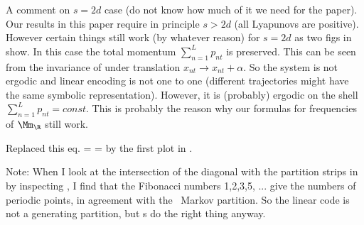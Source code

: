 \begin{description}
  {
A comment on $s=2d$ case (do not know how much of it we need for the paper).
Our results in this paper require in principle  $s>2d$ (all Lyapunovs are
positive). However certain things still work (by whatever reason)  for $s=2d$
as two figs in  show. In this case the total
momentum $\sum_{n=1}^L p_{nt}$ is preserved. This can be seen from the
invariance of  under   translation  $x_{nt}\to
x_{nt}+\alpha$. So the system is not ergodic  and linear encoding is not one
to one (different trajectories might have the same symbolic representation).
However, it is (probably)  ergodic on the shell   $\sum_{n=1}^L p_{nt}=const.$
This is probably the reason why  our formulas for frequencies of  $\Mm_{\R}$
still work.
 }


  {Replaced this eq.
\beq
\Mm\cup\partial\R
    =
    =
by the first plot in .
 }

     {
Note: When I look
at the intersection of the diagonal with the partition strips in by
inspecting , I find that the Fibonacci
numbers 1,2,3,5, ... give the numbers of periodic points, in agreement with
the \AW\ Markov partition. So the linear
code is not a generating partition, but \po s do the right thing anyway.
    }


\end{description}
